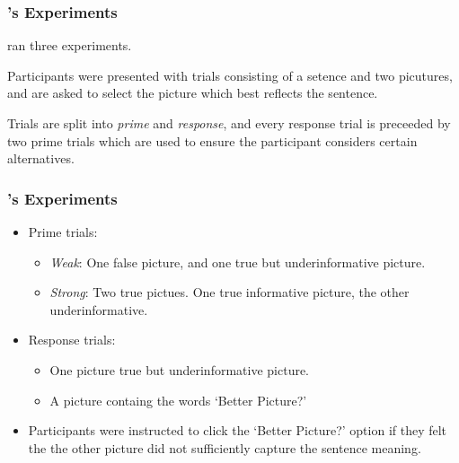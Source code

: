 \documentclass[noamssymb]{beamer}
\newcommand{\hand}{\ding{43}}
\begin{document}
\begin{frame}
  \frametitle{{\ftf \citeauthor{Bott:2016aa}'s Experiments}}

  \citeauthor{Bott:2016aa} ran three experiments.

  Participants were presented with trials consisting of a setence and two picutures, and are asked to select the picture which best reflects the sentence.

  Trials are split into \emph{prime} and \emph{response}, and every response trial is preceeded by two prime trials which are used to ensure the participant considers certain alternatives.

\end{frame}

\begin{frame}
  \frametitle{{\ftf \citeauthor{Bott:2016aa}'s Experiments}}
  \begin{itemize}
  \item Prime trials:
    \begin{itemize}
    \item \emph{Weak}: One false picture, and one true but underinformative picture.
    \item \emph{Strong}: Two true pictues. One true informative picture, the other underinformative.
    \end{itemize}
  \item Response trials:
    \begin{itemize}
    \item One picture true but underinformative picture.
    \item A picture containg the words `Better Picture?'
    \end{itemize}
  \item[\hand] Participants were instructed to click the `Better Picture?' option  if they felt the the other picture did not sufficiently capture the sentence meaning.
  \end{itemize}
\end{frame}
\end{document}
